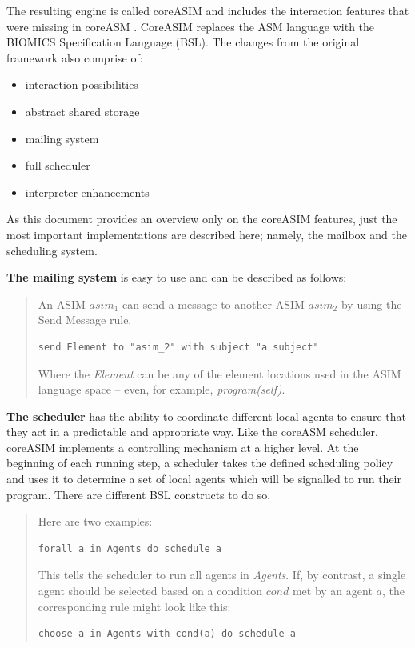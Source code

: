 The resulting engine is called coreASIM and includes the interaction features that were missing in coreASM \cite{BIOMICSD42}\cite{BIOMICSD52}. CoreASIM replaces the ASM language with the BIOMICS Specification Language (BSL). The changes from the original framework also comprise of:

\begin{itemize}
	\item interaction possibilities
	\item abstract shared storage
	\item mailing system
	\item full scheduler
	\item interpreter enhancements
\end{itemize}

As this document provides an overview only on the coreASIM features, just the most important implementations are described here; namely, the mailbox and the scheduling system.

\textbf{The mailing system} is easy to use and can be described as follows:
\begin{quote}
\small
An ASIM $asim_1$ can send a message to another ASIM $asim_2$ by using the Send Message rule.\nopagebreak
\begin{lstlisting}[language=bsl]
	send Element to "asim_2" with subject "a subject"
\end{lstlisting}
Where the \textit{Element} can be any of the element locations used in the ASIM language space -- even, for example, \textit{program(self)}.
\end{quote}

\textbf{The scheduler} has the ability to coordinate different local agents to ensure that they act in a predictable and appropriate way. Like the coreASM scheduler, coreASIM implements a controlling mechanism at a higher level. At the beginning of each running step, a scheduler takes the defined scheduling policy and uses it to determine a set of local agents which will be signalled to run their program. There are different BSL constructs to do so.
\begin{quote}
\small
Here are two examples:
\begin{lstlisting}[language=bsl]
	forall a in Agents do schedule a
\end{lstlisting}
This tells the scheduler to run all agents in \textit{Agents}. If, by contrast, a single agent should be selected based on a condition $cond$ met by an agent $a$, the corresponding rule might look like this:
\begin{lstlisting}[language=bsl]
	choose a in Agents with cond(a) do schedule a
\end{lstlisting}
\end{quote}

